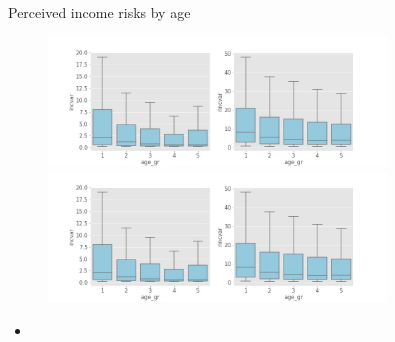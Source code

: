 \documentclass{beamer}
\begin{document}
\begin{frame}{Perceived income risks by age}
	\begin{figure}
		\centering
		\label{boxplot_age_gr}
		\includegraphics[width=0.8\textwidth]{figures/boxplot_exp_age_gr} \\
		\includegraphics[width=0.8\textwidth]{figures/boxplot_var_age_gr}
	\end{figure}
	\begin{itemize}
		\item 
	\end{itemize}
\end{frame}
\end{document}
